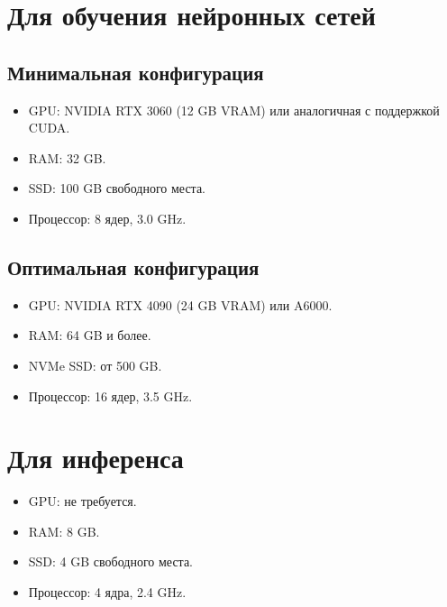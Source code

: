 

\section{Для обучения нейронных сетей}

\subsection{Минимальная конфигурация}
\begin{itemize}
    \item GPU: NVIDIA RTX 3060 (12 GB VRAM) или аналогичная с поддержкой CUDA.
    \item RAM: 32 GB.
    \item SSD: 100 GB свободного места.
    \item Процессор: 8 ядер, 3.0 GHz.
\end{itemize}

\subsection{Оптимальная конфигурация}
\begin{itemize}
    \item GPU: NVIDIA RTX 4090 (24 GB VRAM) или A6000.
    \item RAM: 64 GB и более.
    \item NVMe SSD: от 500 GB.
    \item Процессор: 16 ядер, 3.5 GHz.
\end{itemize}

\section{Для инференса}
\begin{itemize}
    \item GPU: не требуется.
    \item RAM: 8 GB.
    \item SSD: 4 GB свободного места.
    \item Процессор: 4 ядра, 2.4 GHz.
\end{itemize}

